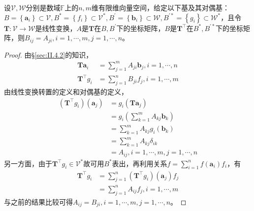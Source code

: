 \documentclass[main.tex]{subfiles}
\begin{document}
\begin{theorem}\label{thm:II.4.16}
设$\mathcal{V},\mathcal{W}$分别是数域$\mathbb{F}$上的$n,m$维有限维向量空间，给定以下基及其对偶基：$B=\left\{\mathbf{a}_i\right\}\subset\mathcal{V},B^*=\left\{f_i\right\}\subset\mathcal{V}^*,B^\prime=\left\{\mathbf{b}_i\right\}\subset\mathcal{W},B^{\prime *}=\left\{g_i\right\}\subset\mathcal{W}^*$，且令$\mathbf{T}:\mathcal{V}\rightarrow\mathcal{W}$是线性变换，$A$是$\mathbf{T}$在$B,B^\prime$下的坐标矩阵，$B$是$\mathbf{T}^\intercal$在$B^*,B^{\prime *}$下的坐标矩阵，则$B_{ij}=A_{ji},i=1,\cdots,m,j=1,\cdots,n$。
\end{theorem}
\begin{proof}
由\S\ref{sec:II.4.2}的知识，
\begin{align*}
\mathbf{Ta}_i&=\sum_{j=1}^mA_{ji}\mathbf{b}_j,i=1,\cdots,n\\
\mathbf{T}^\intercal g_i&=\sum_{j=1}^nB_{ji}f_j,i=1,\cdots,m
\end{align*}
由线性变换转置的定义和对偶基的定义，
\begin{align*}
    \left(\mathbf{T}^\intercal g_i\right)\left(\mathbf{a}_j\right)&=g_i\left(\mathbf{Ta}_j\right)\\
    &=g_i\left(\sum_{k=1}^m A_{kj}\mathbf{b}_k\right)\\
    &=\sum_{k=1}^m A_{kj} g_i\left(\mathbf{b}_k\right)\\
    &=\sum_{k=1}^mA_{kj}\delta_{ik}\\
    &=A_{ij},i=1,\cdots,m,j=1,\cdots,n
\end{align*}
另一方面，由于$\mathbf{T}^\intercal g_i\in\mathcal{V}^*$故可用$B^*$表出，再利用关系$f=\sum_{i=1}^nf\left(\mathbf{a}_i\right)f_i$，有
\begin{align*}
    \mathbf{T}^\intercal g_i&=\sum_{j=1}^n\left(\mathbf{T}^\intercal g_i\right)\left(\mathbf{a}_j\right) f_j\\
    &=\sum_{j=1}^n A_{ij}f_j,i=1,\cdots,m
\end{align*}
与之前的结果比较可得$A_{ij}=B_{ji},i=1,\cdots,m,j=1,\cdots,n$。
\end{proof}
\end{document}
